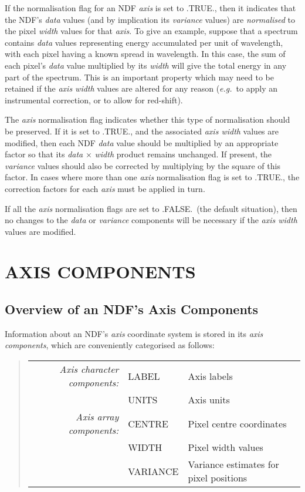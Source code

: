 \documentclass[twoside,11pt,nolof]{starlink}
\providecommand{\st}[1]{{\emph{#1}}}
\begin{document}
If the normalisation flag for an NDF \st{axis\/} is set to .TRUE., then it
indicates that the NDF's \st{data} values (and by implication its
\st{variance\/} values) are \st{normalised\/} to the pixel \st{width\/} values
for that \st{axis\/}.
To give an example, suppose that a spectrum contains \st{data\/} values
representing energy accumulated per unit of wavelength, with each pixel
having a known spread in wavelength.
In this case, the sum of each pixel's \st{data\/} value multiplied by its
\st{width\/} will give the total energy in any part of the spectrum.
This is an important property which may need to be retained if the \st{axis
width\/} values are altered for any reason (\st{e.g.}\ to apply an
instrumental correction, or to allow for red-shift).

The \st{axis\/} normalisation flag indicates whether this type of
normalisation should be preserved.
If it is set to .TRUE., and the associated \st{axis width\/} values are
modified, then each NDF \st{data\/} value should be multiplied by an
appropriate factor so that its \st{data\/} $\times$ \st{width\/} product
remains unchanged.
If present, the \st{variance\/} values should also be corrected by
multiplying by the square of this factor.
In cases where more than one \st{axis\/} normalisation flag is set to
.TRUE., the correction factors for each \st{axis\/} must be applied in
turn.

If all the \st{axis\/} normalisation flags are set to .FALSE.\ (the default
situation), then no changes to the \st{data\/} or \st{variance\/}
components will be necessary if the \st{axis width\/} values are modified.


\section{\label{ss:axiscomponents}AXIS COMPONENTS}

\subsection{Overview of an NDF's Axis Components}

Information about an NDF's \st{axis\/} coordinate system is stored in its
\st{axis components}, which are conveniently categorised as follows:

\small
\begin{quote}
\begin{center}
\begin{tabular}{rl@{ --- }l}
\st{Axis character components:} & LABEL & Axis labels \\
                                 & UNITS & Axis units \\[1.5ex]
    \st{Axis array components:} & CENTRE & Pixel centre coordinates \\
                                 & WIDTH  & Pixel width values \\
                                 & VARIANCE & Variance estimates for pixel
                                              positions
\end{tabular}
\end{center}
\end{quote}
\normalsize
\end{document}

